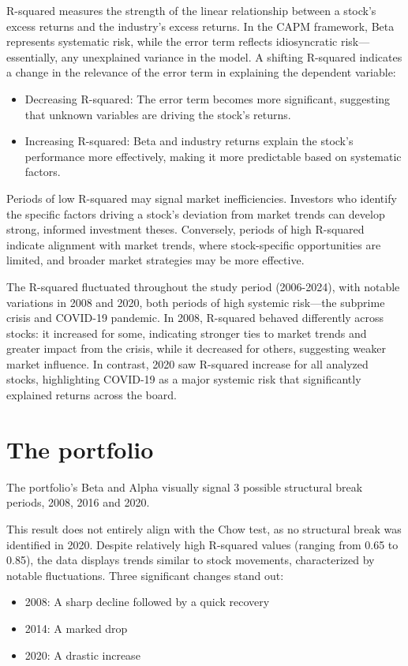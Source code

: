 R-squared measures the strength of the linear relationship between a stock's excess returns and the industry's excess returns. 
In the CAPM framework, Beta represents systematic risk, while the error term reflects idiosyncratic risk—essentially, any
unexplained variance in the model.
A shifting R-squared indicates a change in the relevance of the error term in explaining the dependent variable:
\begin{itemize}
    \item Decreasing R-squared: The error term becomes more significant, suggesting that unknown variables are driving the
    stock's returns.
    \item Increasing R-squared: Beta and industry returns explain the stock's performance more effectively, making it more
    predictable based on systematic factors.
\end{itemize}

Periods of low R-squared may signal market inefficiencies. Investors who identify the specific factors driving a stock's
deviation from market trends can develop strong, informed investment theses. 
Conversely, periods of high R-squared indicate alignment with market trends, where stock-specific opportunities are limited,
and broader market strategies may be more effective.

The R-squared fluctuated throughout the study period (2006-2024), with notable variations in 2008 and 2020, both periods of 
high systemic risk—the subprime crisis and COVID-19 pandemic.
In 2008, R-squared behaved differently across stocks: it increased for some, indicating stronger ties to market trends and
greater impact from the crisis, while it decreased for others, suggesting weaker market influence.
In contrast, 2020 saw R-squared increase for all analyzed stocks, highlighting COVID-19 as a major systemic risk that 
significantly explained returns across the board.

\section{The portfolio}
The portfolio's Beta and Alpha visually signal 3 possible structural break periods, 2008, 2016 and 2020.
 
This result does not entirely align with the Chow test, as no structural break was identified in 2020.
Despite relatively high R-squared values (ranging from 0.65 to 0.85), the data displays trends similar to stock movements, 
characterized by notable fluctuations.
Three significant changes stand out:
\begin{itemize}
    \item 2008: A sharp decline followed by a quick recovery
    \item 2014: A marked drop
    \item 2020: A drastic increase
\end{itemize}
